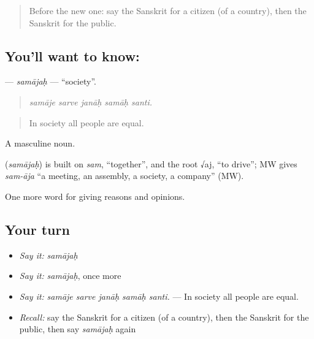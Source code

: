 \label{lesson:SA-C354-samajah}



\begin{quote}
Before the new one: say the Sanskrit for a citizen (of a country), then the Sanskrit for the public.
\end{quote}

\subsection*{You'll want to know: }
\textbf{} — \emph{samājaḥ} — \textquotedblleft{}society\textquotedblright{}.

\begin{quote}
    
\end{quote}

\begin{quote}
\emph{samāje sarve janāḥ samāḥ santi.}
\end{quote}

\begin{quote}
In society all people are equal.
\end{quote}

A masculine noun.

\begin{cousinweb}
\textbf{} (\emph{samājaḥ}) is built on \emph{sam}, \textquotedblleft{}together\textquotedblright{}, and the root √aj, \textquotedblleft{}to drive\textquotedblright{}; MW gives \emph{sam-āja} \textquotedblleft{}a meeting, an assembly, a society, a company\textquotedblright{} (MW).
\end{cousinweb}

\begin{grammarlens}[title={What you've built}]
One more word for giving reasons and opinions.
\end{grammarlens}

\subsection*{Your turn}
\begin{itemize}
\raggedright
  \item \emph{Say it:} \emph{samājaḥ}
  \item \emph{Say it:} \emph{samājaḥ}, once more
  \item \emph{Say it:} \emph{samāje sarve janāḥ samāḥ santi.} — In society all people are equal.
  \item \emph{Recall:} say the Sanskrit for a citizen (of a country), then the Sanskrit for the public, then say \emph{samājaḥ} again
\end{itemize}

